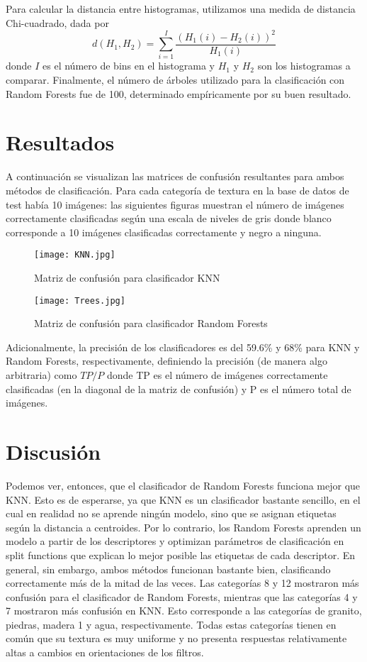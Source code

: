 \documentclass[10pt,twocolumn,letterpaper]{article}
\begin{document}
Para calcular la distancia entre histogramas, utilizamos una medida de distancia Chi-cuadrado, dada por
$$
d(H_1,H_2) = \sum_{i=1}^I \frac{(H_1(i)-H_2(i))^2}{H_1(i)}
$$
donde $I$ es el número de bins en el histograma y $H_1$ y $H_2$ son los histogramas a comparar. 
Finalmente, el número de árboles utilizado para la clasificación con Random Forests fue de 100, determinado empíricamente por su buen resultado.

\section{Resultados}

A continuación se visualizan las matrices de confusión resultantes para ambos métodos de clasificación. Para cada categoría de textura en la base de datos de test había 10 imágenes: las siguientes figuras muestran el número de imágenes correctamente clasificadas según una escala de niveles de gris donde blanco corresponde a 10 imágenes clasificadas correctamente y negro a ninguna. 
\begin{figure}[H]
\centering
\texttt{[image: KNN.jpg]}
\caption{Matriz de confusión para clasificador KNN}
\end{figure}

\begin{figure}[H]
\centering
\texttt{[image: Trees.jpg]}
\caption{Matriz de confusión para clasificador Random Forests}
\end{figure}

Adicionalmente, la precisión de los clasificadores es del 59.6\% y 68\% para KNN y Random Forests, respectivamente, definiendo la precisión (de manera algo arbitraria) como $TP/P$ donde TP es el número de imágenes correctamente clasificadas (en la diagonal de la matriz de confusión) y P es el número total de imágenes. 


\section{Discusión}

Podemos ver, entonces, que el clasificador de Random Forests funciona mejor que KNN. Esto es de esperarse, ya que KNN es un clasificador bastante sencillo, en el cual en realidad no se aprende ningún modelo, sino que se asignan etiquetas según la distancia a centroides. Por lo contrario, los Random Forests aprenden un modelo a partir de los descriptores y optimizan parámetros de clasificación en split functions que explican lo mejor posible las etiquetas de cada descriptor. En general, sin embargo, ambos métodos funcionan bastante bien, clasificando correctamente más de la mitad de las veces. Las categorías 8 y 12 mostraron más confusión para el clasificador de Random Forests, mientras que las categorías 4 y 7 mostraron más confusión en KNN. Esto corresponde a las categorías de granito, piedras, madera 1 y agua, respectivamente. Todas estas categorías tienen en común que su textura es muy uniforme y no presenta respuestas relativamente altas a cambios en orientaciones de los filtros. 
\end{document}
